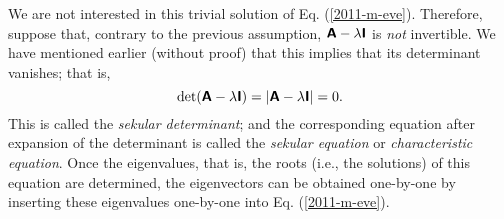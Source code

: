 We are not interested in this trivial solution of Eq. (\ref{2011-m-eve}).
Therefore, suppose that, contrary to the previous assumption,
$\textsf{\textbf{A}} - \lambda \textsf{\textbf{I}}$ is {\em not} invertible.
We have mentioned earlier (without proof) that this implies that its determinant vanishes; that is,
\begin{equation}
\textrm{det} (\textsf{\textbf{A}} - \lambda \textsf{\textbf{I}}) = \vert \textsf{\textbf{A}} - \lambda \textsf{\textbf{I}}\vert =0.
\end{equation}
This is called the {\em sekular determinant};
and the corresponding equation after expansion of the determinant is called the
{\em sekular equation}
or {\em characteristic equation}.
Once the eigenvalues, that is, the roots (i.e., the solutions) of this equation are determined,
the eigenvectors can be obtained one-by-one by inserting these eigenvalues one-by-one into Eq. (\ref{2011-m-eve}).


